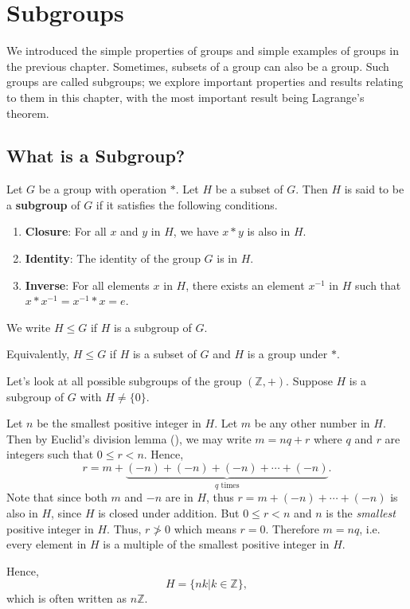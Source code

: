 \chapter{Subgroups}
We introduced the simple properties of groups and simple examples of groups in the previous chapter. Sometimes, subsets of a group can also be a group. Such groups are called subgroups; we explore important properties and results relating to them in this chapter, with the most important result being Lagrange's theorem.

\section{What is a Subgroup?}
\begin{definition}
    Let $G$ be a group with operation $\ast$. Let $H$ be a subset of $G$. Then $H$ is said to be a \textbf{subgroup} of $G$ if it satisfies the following conditions.
    \begin{enumerate}
        \item \textbf{Closure}: For all $x$ and $y$ in $H$, we have $x \ast y$ is also in $H$.
        \item \textbf{Identity}: The identity of the group $G$ is in $H$.
        \item \textbf{Inverse}: For all elements $x$ in $H$, there exists an element $x^{-1}$ in $H$ such that $x \ast x^{-1} = x^{-1} \ast x = e$.
    \end{enumerate}
    We write $H \leq G$ if $H$ is a subgroup of $G$.
\end{definition}
\begin{remark}
    Equivalently, $H \leq G$ if $H$ is a subset of $G$ and $H$ is a group under $\ast$.
\end{remark}

\begin{example}\label{example-subgroups-of-Z}
    Let's look at all possible subgroups of the group $(\mathbb{Z}, +)$. Suppose $H$ is a subgroup of $G$ with $H \neq \{0\}$.

    Let $n$ be the smallest positive integer in $H$. Let $m$ be any other number in $H$. Then by Euclid's division lemma (), we may write $m = nq + r$ where $q$ and $r$ are integers such that $0 \leq r < n$. Hence,
    \[
        r = m + \underbrace{(-n) +(-n) +(-n) + \cdots + (-n)}_{q\text{ times}}.
    \]
    Note that since both $m$ and $-n$ are in $H$, thus $r = m + (-n) + \cdots + (-n)$ is also in $H$, since $H$ is closed under addition. But $0 \leq r < n$ and $n$ is the \textit{smallest} positive integer in $H$. Thus, $r \not> 0$ which means $r = 0$. Therefore $m = nq$, i.e. every element in $H$ is a multiple of the smallest positive integer in $H$.

    Hence,
    \[
    H = \{nk \vert k \in \mathbb{Z}\},
    \]
    which is often written as $n\mathbb{Z}$.
\end{example}

